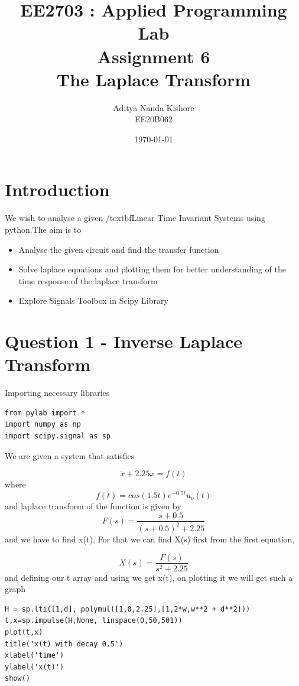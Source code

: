 \documentclass[12pt, a4paper]{report}
\title{\textbf{EE2703 : Applied Programming Lab \\ Assignment 6 \\ The Laplace Transform}}
\author{Aditya Nanda Kishore\\ EE20B062}
\date{\today} %
\begin{document}
		
\maketitle
\section*{Introduction}
We wish to analyse a given /textbf{Linear Time Invariant Systems} using python.The aim is to
\begin{itemize}
	\item Analyse the given circuit and find the transfer function
	\item Solve laplace equations and plotting them for better understanding of the time response of the laplace transform
	\item Explore Signals Toolbox in Scipy Library
\end{itemize}


\section*{Question 1 - Inverse Laplace Transform}
Importing necessary libraries
\begin{Verbatim}
from pylab import *
import numpy as np
import scipy.signal as sp
\end{Verbatim}
We are given a system that satisfies 

\begin{equation}
  \ddot x + 2.25x = f(t)
\end{equation}
where 
\begin{equation}
  	f(t) = cos(1.5t)e^{-0.5t}u_o(t)
\end{equation}
and laplace transform of the function is given by 
\begin{equation}
  	F(s)	= \frac{s+0.5}{(s+0.5)^2 + 2.25}
\end{equation}
and we have to find x(t), For that we can find X(s) first from the first equation,

\begin{equation}
  	X(s) = \frac{F(s)}{s^2+ 2.25}
\end{equation}
 and defining our t array and using  we get x(t), on plotting it we will get such a graph
\begin{Verbatim}
H = sp.lti([1,d], polymul([1,0,2.25],[1,2*w,w**2 + d**2]))
t,x=sp.impulse(H,None, linspace(0,50,501))
plot(t,x)
title('x(t) with decay 0.5')
xlabel('time')
ylabel('x(t)')
show()
\end{Verbatim}
\end{document}
